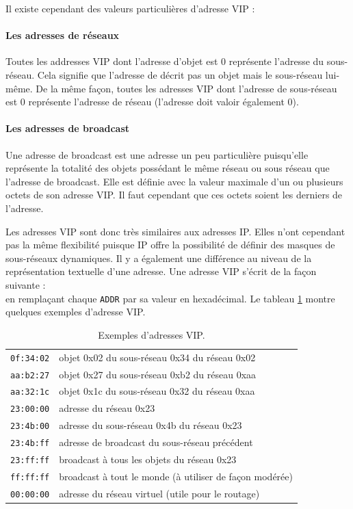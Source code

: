 			Il existe cependant des valeurs particulières d'adresse VIP : 
			\paragraph{Les adresses de réseaux}
				Toutes les addresses VIP dont l'adresse d'objet est 0 représente l'adresse du 
				sous-réseau. Cela signifie que l'adresse de décrit pas un objet mais le sous-réseau 
				lui-même. De la même façon, toutes les adresses VIP dont l'adresse de sous-réseau est 0 
				représente 	l'adresse de réseau (l'adresse doit valoir également 0).
				
			\paragraph{Les adresses de broadcast}
				Une adresse de broadcast est une adresse un peu particulière puisqu'elle représente la
				totalité des objets possédant le même réseau ou sous réseau que l'adresse de broadcast.
				Elle est définie avec la valeur maximale d'un ou plusieurs octets de son adresse VIP.
				Il faut cependant que ces octets soient les derniers de l'adresse.
				
			Les adresses VIP sont donc très similaires aux adresses IP. Elles n'ont cependant pas la
			même flexibilité puisque IP offre la possibilité de définir des masques de sous-réseaux
			dynamiques. Il y a également une différence au niveau de la représentation textuelle d'une
			adresse. Une adresse VIP s'écrit de la façon suivante : \\
			en remplaçant chaque \texttt{ADDR} par sa valeur en hexadécimal. 
			Le tableau \ref{vipExample} montre quelques exemples d'adresse VIP.

			\begin{table}[!ht]
				\centering
				\begin{tabular}{ll}
					\texttt{0f:34:02} & objet 0x02 du sous-réseau 0x34 du réseau 0x02 \\
					\texttt{aa:b2:27} & objet 0x27 du sous-réseau 0xb2 du réseau 0xaa \\
					\texttt{aa:32:1c} & objet 0x1c du sous-réseau 0x32 du réseau 0xaa \\
					\texttt{23:00:00}	& adresse du réseau 0x23	\\
					\texttt{23:4b:00}	& adresse du sous-réseau 0x4b du réseau 0x23 \\
					\texttt{23:4b:ff}	& adresse de broadcast du sous-réseau précédent \\
					\texttt{23:ff:ff}	& broadcast à tous les objets du réseau 0x23 \\
					\texttt{ff:ff:ff}	& broadcast à tout le monde (à utiliser de façon modérée) \\
					\texttt{00:00:00}	& adresse du réseau virtuel (utile pour le routage) \\
				\end{tabular}
				\caption{Exemples d'adresses VIP.}
				\label{vipExample}
			\end{table}

